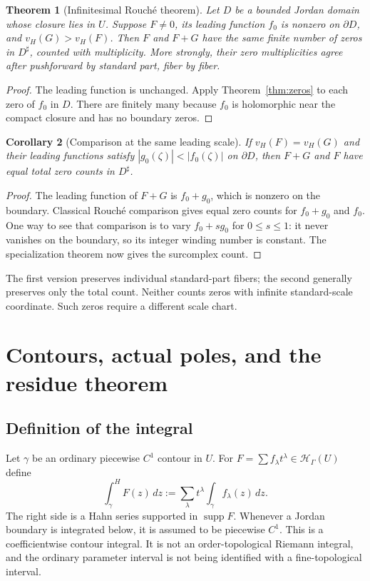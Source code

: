 \documentclass[11pt,a4paper]{article}
\newtheorem{theorem}{Theorem}[section]
\newtheorem{corollary}[theorem]{Corollary}
\theoremstyle{definition}
\theoremstyle{remark}
\newcommand{\HH}{\mathcal H}
\newcommand{\supp}{\operatorname{supp}}
\newcommand{\HI}{\mathop{\int}\nolimits^{\!H}}
\begin{document}
\begin{theorem}[Infinitesimal Rouch\'e theorem]\label{thm:rouche}
Let $D$ be a bounded Jordan domain whose closure lies in $U$.
Suppose $F\ne0$, its leading function $f_0$ is nonzero on
$\partial D$, and $v_H(G)>v_H(F)$. Then $F$ and $F+G$ have the
same finite number of zeros in $D^\sharp$, counted with
multiplicity. More strongly, their zero multiplicities agree after
pushforward by standard part, fiber by fiber.
\end{theorem}
\begin{proof}
The leading function is unchanged. Apply
Theorem~\ref{thm:zeros} to each zero of $f_0$ in $D$. There are
finitely many because $f_0$ is holomorphic near the compact closure
and has no boundary zeros.
\end{proof}

\begin{corollary}[Comparison at the same leading scale]
If $v_H(F)=v_H(G)$ and their leading functions satisfy
$|g_0(\zeta)|<|f_0(\zeta)|$ on $\partial D$, then $F+G$ and $F$
have equal total zero counts in $D^\sharp$.
\end{corollary}
\begin{proof}
The leading function of $F+G$ is $f_0+g_0$, which is nonzero on the
boundary. Classical Rouch\'e comparison gives equal zero counts for
$f_0+g_0$ and $f_0$. One way to see that comparison is to vary
$f_0+s g_0$ for $0\le s\le1$: it never vanishes on the boundary,
so its integer winding number is constant. The specialization theorem
now gives the surcomplex count.
\end{proof}
The first version preserves individual standard-part fibers; the
second generally preserves only the total count. Neither counts zeros
with infinite standard-scale coordinate. Such zeros require a different
scale chart.

\section{Contours, actual poles, and the residue theorem}\label{sec:residues}
\subsection{Definition of the integral}
Let $\gamma$ be an ordinary piecewise $C^1$ contour in $U$. For
$F=\sum f_\lambda t^\lambda\in\HH_\Gamma(U)$ define
\begin{equation}\label{eq:Hint}
 \HI_\gamma F(z)\,dz
   :=\sum_\lambda t^\lambda\int_\gamma f_\lambda(z)\,dz.
\end{equation}
The right side is a Hahn series supported in $\supp F$. Whenever a Jordan boundary is integrated below, it is assumed to be
piecewise $C^1$. This is a coefficientwise contour integral. It is not an order-topological
Riemann integral, and the ordinary parameter interval is not being
identified with a fine-topological interval.
\end{document}

